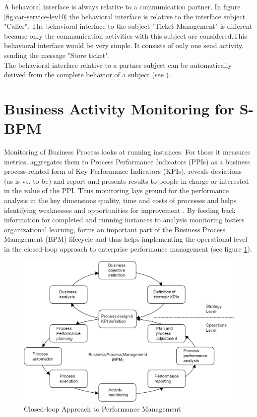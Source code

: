 A behavoral interface is always relative to a communication partner. In figure \ref{fig:car-service-lev10} the behavioral interface is relative to the interface subject "Caller". The behavioral interface to the subject "Ticket Management" is different because only the communication activities with this subject are considered.This behavioral interface would be very simple. It consists of only one send activity, sending the message "Store ticket".\\
The behavioral interface relative to a partner subject can be automatically derived from the complete behavior of a subject
(see \cite{article:jCPEX}).


\section{Business Activity Monitoring for S-BPM}

Monitoring of Business Process looks at running instances. For those it measures metrics, aggregates them to Process Performance Indicators (PPIs) as a business process-related form of Key Performance Indicators (KPIs), reveals deviations (as-is vs. to-be) and report and presents results to people in charge or interested in the value of the PPI. Thus monitoring lays ground for the performance analysis in the key dimensions quality, time and costs of processes and helps identifying weaknesses and opportunities for improvement \cite{book:UntPerform}.
By feeding back information for completed and running instances to analysis monitoring fosters organizational learning, forms an important part of the Business Process Management (BPM) lifecycle \cite{article:SUbjetorientiertBPM} and thus helps implementing the operational level in the closed-loop approach to enterprise performance management \cite{book:processmonitoring} (see figure \ref{fig:Approach-Performance}).
\\


\begin{figure}[htbp]
	\centering
	\includegraphics[width=0.8\linewidth]{Figures/Chapter5/Monitoring/Approach-Performance-Mgmt.jpg}
	\caption[Closed-loop Approach to Performance Management]{Closed-loop Approach to Performance Management \cite{book:AnalytInfSys}}
	\label{fig:Approach-Performance}
\end{figure}



